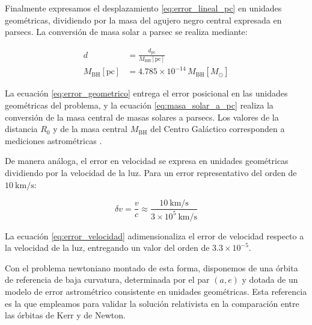 Finalmente expresamos el desplazamiento \eqref{eq:error_lineal_pc} en unidades geométricas, dividiendo por la masa del agujero negro central expresada en parsecs. La conversión de masa solar a parsec se realiza mediante:

\begin{align}
    d &= \frac{d_{\text{pc}}}{M_{\text{BH}}[\text{pc}]} \label{eq:error_geometrico} \\
    M_{\text{BH}}[\text{pc}] &= 4.785 \times 10^{-14}\, M_{\text{BH}}[M_\odot] \label{eq:masa_solar_a_pc}
\end{align}

La ecuación \eqref{eq:error_geometrico} entrega el error posicional en las unidades geométricas del problema, y la ecuación \eqref{eq:masa_solar_a_pc} realiza la conversión de la masa central de masas solares a parsecs. Los valores de la distancia $R_0$ y de la masa central $M_{\text{BH}}$ del Centro Galáctico corresponden a mediciones astrométricas \cite{gillessen2017monitoring}.

De manera análoga, el error en velocidad se expresa en unidades geométricas dividiendo por la velocidad de la luz. Para un error representativo del orden de $10\ \text{km/s}$:

\begin{equation}
    \delta v = \frac{v}{c} \approx \frac{10\ \text{km/s}}{3 \times 10^5\ \text{km/s}} \label{eq:error_velocidad}
\end{equation}

La ecuación \eqref{eq:error_velocidad} adimensionaliza el error de velocidad respecto a la velocidad de la luz, entregando un valor del orden de $3.3 \times 10^{-5}$.

Con el problema newtoniano montado de esta forma, disponemos de una órbita de referencia de baja curvatura, determinada por el par $(a, e)$ y dotada de un modelo de error astrométrico consistente en unidades geométricas. Esta referencia es la que empleamos para validar la solución relativista en la comparación entre las órbitas de Kerr y de Newton.
